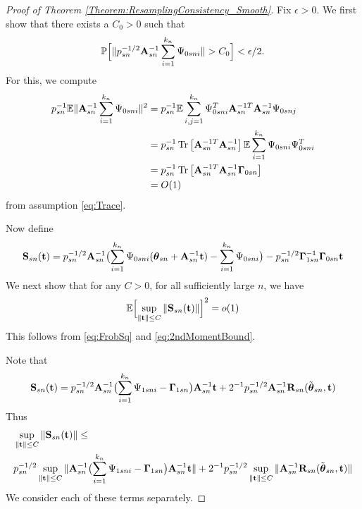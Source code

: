 \begin{proof}[Proof of Theorem \ref{Theorem:ResamplingConsistency_Smooth}]
Fix $\epsilon > 0$. We first show that there exists a $C_{0} > 0$ such that
%
\begin{equation} 
{\mathbb{P}} \Bigl[ 
\| p_{s n}^{-1/2}  {\mathbf{A}}_{ s n}^{-1}  \sum_{i = 1}^{ k_{n}} \Psi_{0 s n i} \| 
> C_{0} 
\Bigr] 
< \epsilon/2.
\label{eq:Bound1}
\end{equation}
For this, we compute 
\begin{align}
p_{s n}^{-1} 
{\mathbb{E}} \| {\mathbf{A}}_{ s n}^{-1}  \sum_{i = 1}^{ k_{n}} \Psi_{0 s n i} \|^{2} & = p_{s n}^{-1} {\mathbb{E}}  \sum_{i, j = 1}^{ k_{n}} \Psi_{0 s n i}^{T} {\mathbf{A}}_{ s n}^{-1T} {\mathbf{A}}_{ s n}^{-1}   \Psi_{0 s n j} \notag\\
& = p_{s n}^{-1} \operatorname*{Tr} \left[ {\mathbf{A}}_{ s n}^{-1T} {\mathbf{A}}_{ s n}^{-1} \right]
{\mathbb{E}}  \sum_{i = 1}^{ k_{n}} \Psi_{0 s n i} \Psi_{0 s n i}^{T} \notag\\
& = p_{s n}^{-1} \operatorname*{Tr} \left[ {\mathbf{A}}_{ s n}^{-1T} {\mathbf{A}}_{ s n}^{-1}  {\boldsymbol{\Gamma}}_{0 s n} \right] \notag\\
& = O (1)
\end{align} 
from assumption \ref{eq:Trace}. 
 
Now define
% 
\begin{align} 
{\mathbf{S}}_{s n} ({\bf{t}}) = 
p_{s n}^{-1/2} {\mathbf{A}}_{ s n}^{-1} \bigl( \sum_{i = 1}^{ k_{n}} \Psi_{0 s n i} 
({\boldsymbol{\theta}}_{ s n} + {\mathbf{A}}_{ s n}^{-1} {\bf{t}}) 
- \sum_{i = 1}^{ k_{n}} \Psi_{0 s n i}  \bigr) 
- p_{s n}^{-1/2}  {\boldsymbol{\Gamma}}_{1 s n }^{-1} {\boldsymbol{\Gamma}}_{0 s n } {\bf{t}} 
\end{align}
We next show that for any $C > 0$, for all sufficiently large $n$, we have
%
\begin{equation}\label{eq:Bound2}
{\mathbb{E}} \Bigl[ \sup_{ \| {\bf{t}} \| \leq C} \| {\mathbf{S}}_{s n} ({\bf{t}}) \| \Bigr]^{2} = o (1) 
\end{equation}
%
This follows from \ref{eq:FrobSq} and \ref{eq:2ndMomentBound}.
 
Note that
%
 \begin{align} 
 {\mathbf{S}}_{s n} ({\bf{t}}) = 
p_{s n}^{-1/2}  {\mathbf{A}}_{ s n}^{-1} 
 \bigl( \sum_{i = 1}^{ k_{n}} \Psi_{1 s n i} - {\boldsymbol{\Gamma}}_{1 s n } \bigr) 
 {\mathbf{A}}_{ s n}^{-1} {\bf{t}}
+ 2^{-1} p_{s n}^{-1/2}  {\mathbf{A}}_{ s n}^{-1} {\mathbf{R}}_{ s n} (\tilde{{\boldsymbol{\theta}}}_{s n },  {\bf{t}})
\end{align}
%
Thus
% 
\begin{align} 
& \sup_{ \| {\bf{t}} \| \leq C} \| {\mathbf{S}}_{s n} ({\bf{t}}) \| 
\leq \notag \\
& p_{s n}^{-1/2} \sup_{ \| {\bf{t}} \| \leq C} \| 
 {\mathbf{A}}_{ s n}^{-1} 
 \bigl( \sum_{i = 1}^{ k_{n}} \Psi_{1 s n i} - {\boldsymbol{\Gamma}}_{1 s n } \bigr) 
 {\mathbf{A}}_{ s n}^{-1} {\bf{t}}
\| 
+ 
2^{-1} p_{s n}^{-1/2} 
\sup_{ \| {\bf{t}} \| \leq C} \| 
 {\mathbf{A}}_{ s n}^{-1} {\mathbf{R}}_{ s n} (\tilde{{\boldsymbol{\theta}}}_{s n },  {\bf{t}})
\|
\end{align}
We consider each of these terms separately. 


\end{proof}
